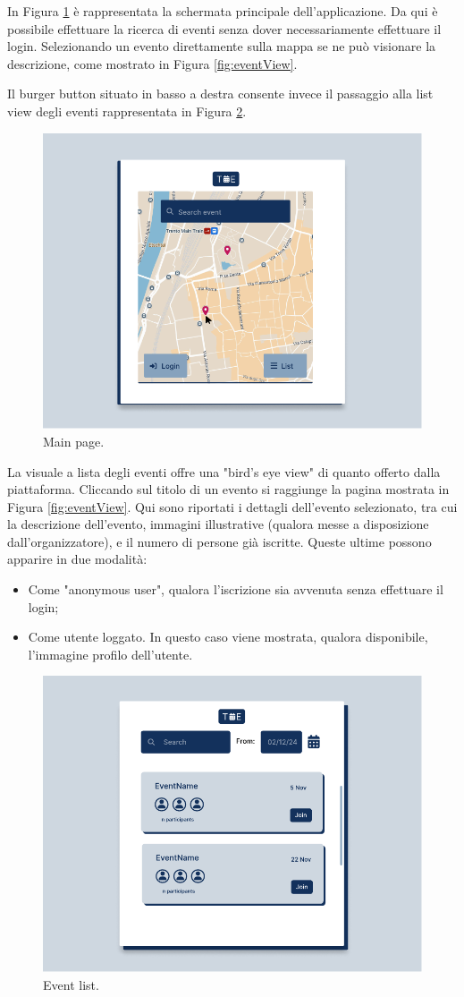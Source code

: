 \documentclass[9pt]{extarticle}
\begin{document}
In Figura \ref{fig:mainPage} è rappresentata la schermata principale dell'applicazione. Da qui è possibile effettuare la ricerca di eventi senza dover necessariamente effettuare il login. Selezionando un evento direttamente sulla mappa se ne può visionare la descrizione, come mostrato in Figura \ref{fig:eventView}.

Il burger button situato in basso a destra consente invece il passaggio alla list view degli eventi rappresentata in Figura \ref{fig:eventListSearch}.

\begin{figure}[!htb]
	\centering
	\includegraphics[width=.7\linewidth]{./images/MainPage.pdf}
	\caption{Main page.}
	\label{fig:mainPage}
\end{figure}


La visuale a lista degli eventi offre una "bird's eye view" di quanto offerto dalla piattaforma. Cliccando sul titolo di un evento si raggiunge la pagina mostrata in Figura \ref{fig:eventView}. Qui sono riportati i dettagli dell'evento selezionato, tra cui la descrizione dell'evento, immagini illustrative (qualora messe a disposizione dall'organizzatore), e il numero di persone già iscritte. Queste ultime possono apparire in due modalità:
\begin{itemize}
	\item Come "anonymous user", qualora l'iscrizione sia avvenuta senza effettuare il login;
	\item Come utente loggato. In questo caso viene mostrata, qualora disponibile, l'immagine profilo dell'utente.
\end{itemize}

\begin{figure}[!htb]
	\centering
	\includegraphics[width=.7\linewidth]{./images/EventListSearch.pdf}
	\caption{Event list.}
	\label{fig:eventListSearch}
\end{figure}
\end{document}
